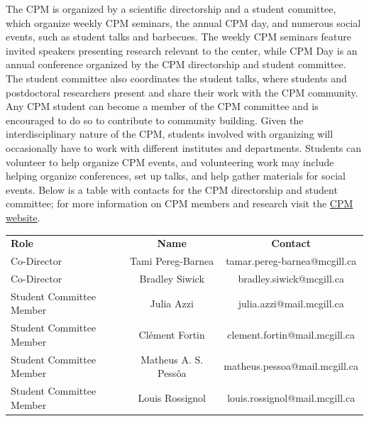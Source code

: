 The CPM is organized by a scientific directorship and a student committee, which organize weekly CPM seminars, the annual CPM day, and numerous social events, such as student talks and barbecues. The weekly CPM seminars feature invited speakers presenting research relevant to the center, while CPM Day is an annual conference organized by the CPM directorship and student committee. The student committee also coordinates the student talks, where students and postdoctoral researchers present and share their work with the CPM community. Any CPM student can become a member of the CPM committee and is encouraged to do so to contribute to community building. Given the interdisciplinary nature of the CPM, students involved with organizing will occasionally have to work with different institutes and departments. Students can volunteer to help organize CPM events, and volunteering work may include helping organize conferences, set up talks, and help gather materials for social events. Below is a table with contacts for the CPM directorship and student committee; for more information on CPM members and research visit the \href{https://cpm.research.mcgill.ca}{CPM website}.

\vspace{-5 pt}
 \begin{table}[hbt!]
    \centering
    \renewcommand{\arraystretch}{1.2}
    \begin{tabular}{|>{\columncolor{ocre!20}}lc>{\columncolor{ocre!20}}c|}
    \hline
    \rowcolor{ocre!60}
  {\color{white}\large\sffamily \textbf{Role}} & {\color{white}\large\sffamily \textbf{Name}}   & {\color{white}\large\sffamily \textbf{Contact}} \\

        Co-Director & Tami Pereg-Barnea & tamar.pereg-barnea@mcgill.ca \\
        Co-Director & Bradley Siwick & bradley.siwick@mcgill.ca \\
        Student Committee Member & Julia Azzi & julia.azzi@mail.mcgill.ca \\
        Student Committee Member & Clément Fortin & clement.fortin@mail.mcgill.ca \\
        Student Committee Member & Matheus A. S. Pessôa & matheus.pessoa@mail.mcgill.ca\\
        Student Committee Member & Louis Rossignol & louis.rossignol@mail.mcgill.ca\\
        
        \hline
\end{tabular}
\end{table} 

